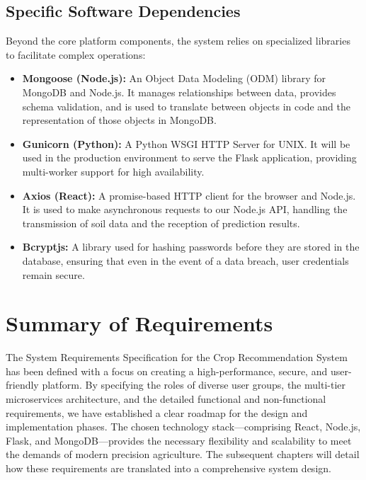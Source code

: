 \documentclass[12pt,a4paper]{report}
\begin{document}
\subsection{Specific Software Dependencies}
Beyond the core platform components, the system relies on specialized libraries to facilitate complex operations:
\begin{itemize}
    \item \textbf{Mongoose (Node.js):} An Object Data Modeling (ODM) library for MongoDB and Node.js. It manages relationships between data, provides schema validation, and is used to translate between objects in code and the representation of those objects in MongoDB.
    \item \textbf{Gunicorn (Python):} A Python WSGI HTTP Server for UNIX. It will be used in the production environment to serve the Flask application, providing multi-worker support for high availability.
    \item \textbf{Axios (React):} A promise-based HTTP client for the browser and Node.js. It is used to make asynchronous requests to our Node.js API, handling the transmission of soil data and the reception of prediction results.
    \item \textbf{Bcryptjs:} A library used for hashing passwords before they are stored in the database, ensuring that even in the event of a data breach, user credentials remain secure.
\end{itemize}

\section{Summary of Requirements}
The System Requirements Specification for the Crop Recommendation System has been defined with a focus on creating a high-performance, secure, and user-friendly platform. By specifying the roles of diverse user groups, the multi-tier microservices architecture, and the detailed functional and non-functional requirements, we have established a clear roadmap for the design and implementation phases. The chosen technology stack—comprising React, Node.js, Flask, and MongoDB—provides the necessary flexibility and scalability to meet the demands of modern precision agriculture. The subsequent chapters will detail how these requirements are translated into a comprehensive system design.


\end{document}
